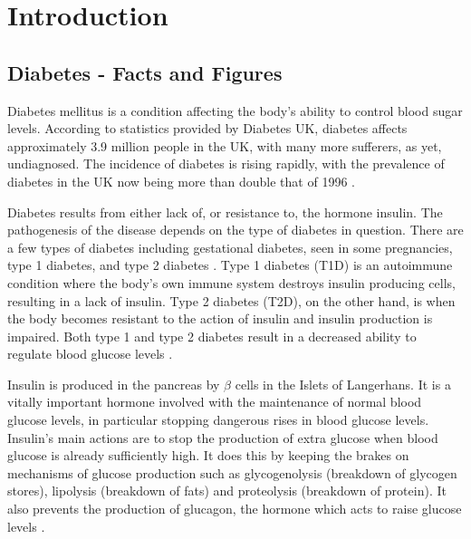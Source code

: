 
\chapter{Introduction}


\section{Diabetes - Facts and Figures}
\label{sec:sectionLabel}


Diabetes mellitus is a condition affecting the body's ability to control blood sugar levels.
According to statistics provided by Diabetes UK, diabetes affects approximately 3.9 million people in the UK, with many more sufferers, as yet, undiagnosed.
The incidence of diabetes is rising rapidly, with the prevalence of diabetes in the UK now being more than double that of 1996 \citep{DiabetesUK}.


Diabetes results from either lack of, or resistance to, the hormone insulin.
The pathogenesis of the disease depends on the type of diabetes in question.
There are a few types of diabetes including gestational diabetes, seen in some pregnancies, type 1 diabetes, and type 2 diabetes \citep{DiabetesUK}.
Type 1 diabetes (T1D) is an autoimmune condition where the body's own immune system destroys insulin producing cells, resulting in a lack of insulin.
Type 2 diabetes (T2D), on the other hand, is when the body becomes resistant to the action of insulin and insulin production is impaired.
Both type 1 and type 2 diabetes result in a decreased ability to regulate blood glucose levels \citep{Cnop2005}.

Insulin is produced in the pancreas by $\beta$ cells in the Islets of Langerhans.
It is a vitally important hormone involved with the maintenance of normal blood glucose levels, in particular stopping dangerous rises in blood glucose levels.
Insulin's main actions are to stop the production of extra glucose when blood glucose is already sufficiently high.
It does this by keeping the brakes on mechanisms of glucose production such as glycogenolysis (breakdown of glycogen stores), lipolysis (breakdown of fats) and proteolysis (breakdown of protein).
It also prevents the production of glucagon, the hormone which acts to raise glucose levels \citep{Sonksen2000}.

